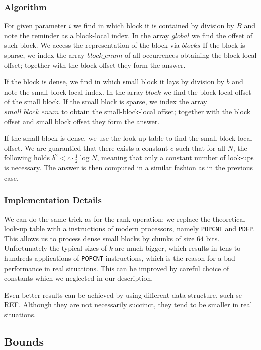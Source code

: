 \subsubsection{Algorithm}

For given parameter $i$ we find in which block it is contained by division by $B$ and note the reminder as a block-local index.
In the array $global$ we find the offset of such block.
We access the representation of the block via $blocks$
If the block is sparse, we index the array $block\_enum$ of all occurrences obtaining the block-local offset; together with the block offset they form the answer.

If the block is dense, we find in which small block it lays by division by $b$ and note the small-block-local index.
In the array $block$ we find the block-local offset of the small block.
If the small block is sparse, we index the array $small\_block\_enum$ to obtain the small-block-local offset; together with the block offset and small block offset they form the answer.

If the small block is dense, we use the look-up table to find the small-block-local offset.
We are guarantied that there exists a constant $c$ such that for all $N$, the following holds $b^2 < c \cdot \frac{1}{2} \log N$, meaning that only a constant number of look-ups is necessary.
The answer is then computed in a similar fashion as in the previous case.

\subsubsection{Implementation Details}

We can do the same trick as for the rank operation: we replace the theoretical look-up table with a instructions of modern processors, namely \verb|POPCNT| and \verb|PDEP|.
This allows us to process dense small blocks by chunks of size $64$ bits.
Unfortunately the typical sizes of $k$ are much bigger, which results in tens to hundreds applications of \verb|POPCNT| instructions, which is the reason for a bad performance in real situations.
This can be improved by careful choice of constants which we neglected in our description.

Even better results can be achieved by using different data structure, such se REF.
Although they are not necessarily succinct, they tend to be smaller in real situations.

\subsection{Bounds}

